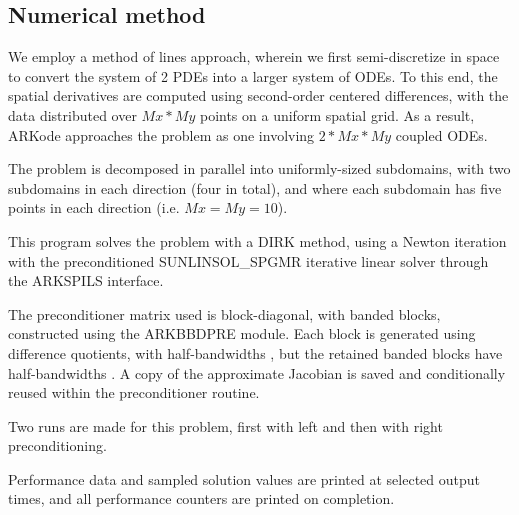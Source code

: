 \documentclass[letterpaper,10pt,english]{sphinxmanual}
\begin{document}
\subsection{Numerical method}
\label{c_parallel:numerical-method}
We employ a method of lines approach, wherein we first
semi-discretize in space to convert the system of 2 PDEs into a larger
system of ODEs.  To this end, the spatial derivatives are computed
using second-order centered differences, with the data distributed
over \(Mx*My\) points on a uniform spatial grid.  As a result, ARKode
approaches the problem as one involving \(2*Mx*My\) coupled ODEs.

The problem is decomposed in parallel into uniformly-sized subdomains,
with two subdomains in each direction (four in total), and where each
subdomain has five points in each direction (i.e. \(Mx=My=10\)).

This program solves the problem with a DIRK method, using a Newton
iteration with the preconditioned SUNLINSOL\_SPGMR iterative linear
solver through the ARKSPILS interface.

The preconditioner matrix used is block-diagonal, with banded blocks,
constructed using the ARKBBDPRE module.  Each block is generated using
difference quotients, with half-bandwidths , but
the retained banded blocks have half-bandwidths .
A copy of the approximate Jacobian is saved and conditionally reused
within the preconditioner routine.

Two runs are made for this problem, first with left and then with
right preconditioning.

Performance data and sampled solution values are printed at
selected output times, and all performance counters are printed
on completion.
\end{document}
